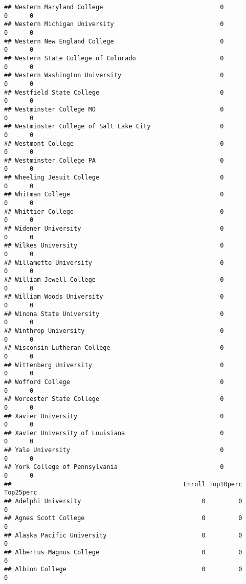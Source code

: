 \documentclass[
]{article}
\begin{document}
\begin{verbatim}
## Western Maryland College                                0          0      0
## Western Michigan University                             0          0      0
## Western New England College                             0          0      0
## Western State College of Colorado                       0          0      0
## Western Washington University                           0          0      0
## Westfield State College                                 0          0      0
## Westminster College MO                                  0          0      0
## Westminster College of Salt Lake City                   0          0      0
## Westmont College                                        0          0      0
## Westminster College PA                                  0          0      0
## Wheeling Jesuit College                                 0          0      0
## Whitman College                                         0          0      0
## Whittier College                                        0          0      0
## Widener University                                      0          0      0
## Wilkes University                                       0          0      0
## Willamette University                                   0          0      0
## William Jewell College                                  0          0      0
## William Woods University                                0          0      0
## Winona State University                                 0          0      0
## Winthrop University                                     0          0      0
## Wisconsin Lutheran College                              0          0      0
## Wittenberg University                                   0          0      0
## Wofford College                                         0          0      0
## Worcester State College                                 0          0      0
## Xavier University                                       0          0      0
## Xavier University of Louisiana                          0          0      0
## Yale University                                         0          0      0
## York College of Pennsylvania                            0          0      0
##                                               Enroll Top10perc Top25perc
## Adelphi University                                 0         0         0
## Agnes Scott College                                0         0         0
## Alaska Pacific University                          0         0         0
## Albertus Magnus College                            0         0         0
## Albion College                                     0         0         0

\end{verbatim}
\end{document}
